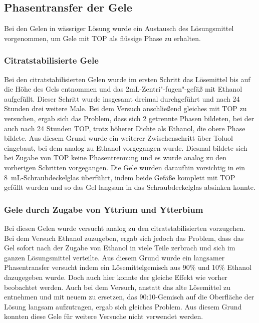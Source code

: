 	\subsection{Phasentransfer der Gele}
	
			Bei den Gelen in wässriger Lösung wurde ein Austausch des Lösungsmittel vorgenommen, um Gele mit TOP als flüssige Phase zu erhalten.
			\subsubsection{Citratstabilisierte Gele}
				Bei den citratstabilisierten Gelen wurde im ersten Schritt das Lösemittel bis auf die Höhe des Gels  entnommen und das 2mL-Zentri"-fugen"-gefäß mit Ethanol aufgefüllt.
				Dieser Schritt wurde insgesamt dreimal durchgeführt und nach 24 Stunden drei weitere Male.
				Bei dem Versuch anschließend gleiches mit TOP zu versuchen, ergab sich das Problem, dass sich 2 getrennte Phasen bildeten, bei der auch nach 24 Stunden TOP, trotz höherer Dichte als Ethanol, die obere Phase bildete.
				Aus diesem Grund wurde ein weiterer Zwischenschritt über Toluol eingebaut, bei dem analog zu Ethanol vorgegangen wurde.
				Diesmal bildete sich bei Zugabe von TOP keine Phasentrennung und es wurde analog zu den vorherigen Schritten vorgegangen.
				Die Gele wurden daraufhin vorsichtig in ein \SI{8}{\milli\liter}-Schraubdeckelglas überführt, indem beide Gefäße komplett mit TOP gefüllt wurden und so das Gel langsam in das Schraubdeckelglas absinken konnte.
			
			\subsubsection{Gele durch Zugabe von Yttrium und Ytterbium}
				Bei diesen Gelen wurde versucht analog zu den citratstabilisierten vorzugehen.
				Bei dem Versuch Ethanol zuzugeben, ergab sich jedoch das Problem, dass das Gel sofort nach der Zugabe von Ethanol in viele Teile zerbrach und sich im ganzen Lösungsmittel verteilte.
				Aus diesem Grund wurde ein langsamer Phasentransfer versucht indem ein Lösemittelgemisch aus 90\%  und 10\% Ethanol dazugegeben wurde.
				Doch auch hier konnte der gleiche Effekt wie vorher beobachtet werden.
				Auch bei dem Versuch, anstatt das alte Lösemittel zu entnehmen und mit neuem zu ersetzen, das 90:10-Gemisch auf die Oberfläche der Lösung langsam aufzutragen, ergab sich gleiches Problem.
				Aus diesem Grund konnten diese Gele für weitere Versuche nicht verwendet werden.   
	
